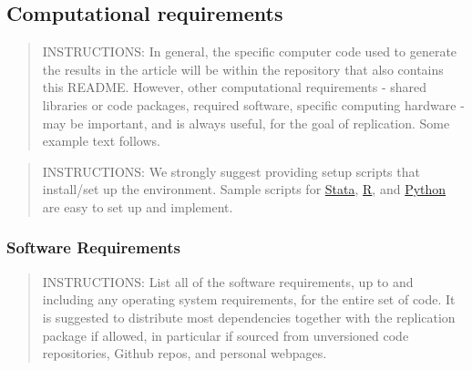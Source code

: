 \documentclass[
]{article}
\begin{document}
\hypertarget{computational-requirements}{%
\subsection{Computational
requirements}\label{computational-requirements}}

\begin{quote}
INSTRUCTIONS: In general, the specific computer code used to generate
the results in the article will be within the repository that also
contains this README. However, other computational requirements - shared
libraries or code packages, required software, specific computing
hardware - may be important, and is always useful, for the goal of
replication. Some example text follows.
\end{quote}

\begin{quote}
INSTRUCTIONS: We strongly suggest providing setup scripts that
install/set up the environment. Sample scripts for
\href{https://github.com/gslab-econ/template/blob/master/config/config_stata.do}{Stata},
\href{https://github.com/labordynamicsinstitute/paper-template/blob/master/programs/global-libraries.R}{R},
and \href{https://pip.readthedocs.io/en/1.1/requirements.html}{Python}
are easy to set up and implement.
\end{quote}

\hypertarget{software-requirements}{%
\subsubsection{Software Requirements}\label{software-requirements}}

\begin{quote}
INSTRUCTIONS: List all of the software requirements, up to and including
any operating system requirements, for the entire set of code. It is
suggested to distribute most dependencies together with the replication
package if allowed, in particular if sourced from unversioned code
repositories, Github repos, and personal webpages.
\end{quote}
\end{document}
